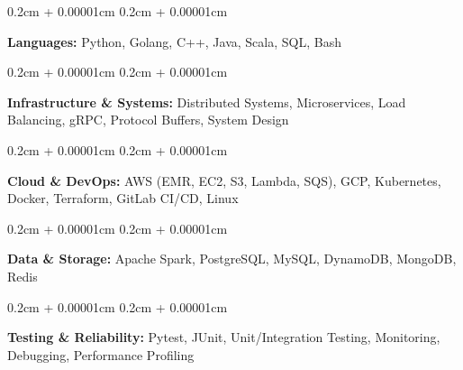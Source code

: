 \documentclass[9pt]{extarticle}
\newenvironment{onecolentry}{
    \begin{adjustwidth}{
        0.2cm + 0.00001cm
    }{
        0.2cm + 0.00001cm
    }
}{
    \end{adjustwidth}
}
\begin{document}
    \begin{onecolentry}
        \textbf{Languages:} Python, Golang, C++, Java, Scala, SQL, Bash
    \end{onecolentry}

    \begin{onecolentry}
        \textbf{Infrastructure \& Systems:} Distributed Systems, Microservices, Load Balancing, gRPC, Protocol Buffers, System Design
    \end{onecolentry}

    \begin{onecolentry}
        \textbf{Cloud \& DevOps:} AWS (EMR, EC2, S3, Lambda, SQS), GCP, Kubernetes, Docker, Terraform, GitLab CI/CD, Linux
    \end{onecolentry}

    \begin{onecolentry}
        \textbf{Data \& Storage:} Apache Spark, PostgreSQL, MySQL, DynamoDB, MongoDB, Redis
    \end{onecolentry}

    \begin{onecolentry}
        \textbf{Testing \& Reliability:} Pytest, JUnit, Unit/Integration Testing, Monitoring, Debugging, Performance Profiling
    \end{onecolentry}
\end{document}
